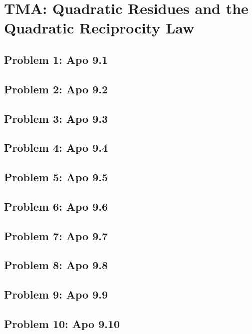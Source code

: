 \section{TMA: Quadratic Residues and the Quadratic Reciprocity Law}

\subsection[Problem 1]{Problem 1: Apo 9.1}

\subsection[Problem 2]{Problem 2: Apo 9.2}

\subsection[Problem 3]{Problem 3: Apo 9.3}

\subsection[Problem 4]{Problem 4: Apo 9.4}

\subsection[Problem 5]{Problem 5: Apo 9.5}

\subsection[Problem 6]{Problem 6: Apo 9.6}

\subsection[Problem 7]{Problem 7: Apo 9.7}

\subsection[Problem 8]{Problem 8: Apo 9.8}

\subsection[Problem 9]{Problem 9: Apo 9.9}

\subsection[Problem 10]{Problem 10: Apo 9.10}